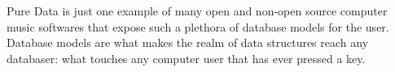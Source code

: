 \documentclass[
]{book}
\begin{document}
Pure Data is just one example of many open and non-open source computer music softwares that expose such a plethora of database models for the user. Database models are what makes the realm of data structures reach any databaser: what touches any computer user that has ever pressed a key.

{
\backmatter
\singlespacing
{}
\printglossaries
\printbibliography
{}
}
\end{document}
